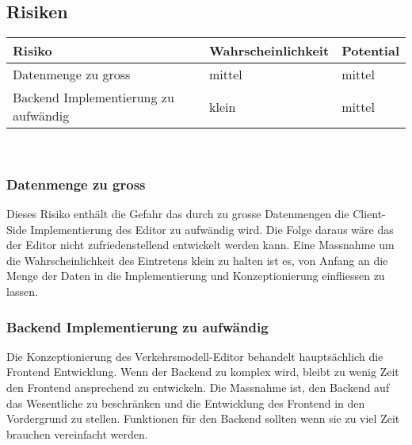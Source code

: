 \subsection{Risiken}
\begin{flushleft}
\begin{tabular}{l l l}
Risiko & Wahrscheinlichkeit & Potential\\
\hline
Datenmenge zu gross & mittel & mittel\\
Backend Implementierung zu aufwändig & klein & mittel\\
\end{tabular}\\[0.2cm]
\subsubsection*{Datenmenge zu gross}
Dieses Risiko enthält die Gefahr das durch zu grosse Datenmengen die Client-Side Implementierung des Editor zu aufwändig wird. Die Folge daraus wäre das der Editor nicht zufriedenstellend entwickelt werden kann. Eine Massnahme um die Wahrscheinlichkeit des Eintretens klein zu halten ist es, von Anfang an die Menge der Daten in die Implementierung und Konzeptionierung einfliessen zu lassen.\\[0.2cm]
\subsubsection*{Backend Implementierung zu aufwändig}
Die Konzeptionierung des Verkehrsmodell-Editor behandelt hauptsächlich die Frontend Entwicklung. Wenn der Backend zu komplex wird, bleibt zu wenig Zeit den Frontend ansprechend zu entwickeln. Die Massnahme ist, den Backend auf das Wesentliche zu beschränken und die Entwicklung des Frontend in den Vordergrund zu stellen. Funktionen für den Backend sollten wenn sie zu viel Zeit brauchen vereinfacht werden.\\

\end{flushleft}

